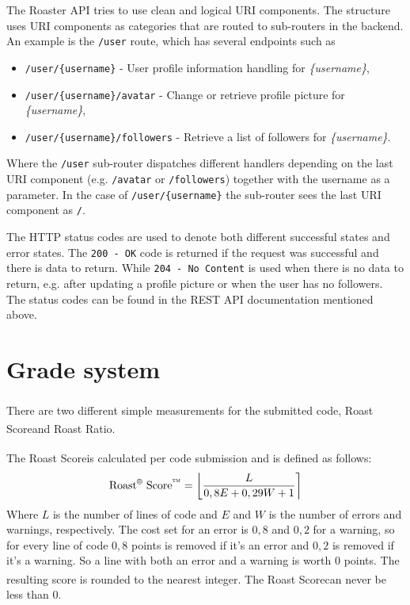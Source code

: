 \documentclass[12pt,a4paper]{report}
\begin{document}
The Roaster API tries to use clean and logical URI components. The structure uses URI components as categories that are routed to sub-routers in the backend. An example is the \texttt{/user} route, which has several endpoints such as
\begin{itemize}
    \item \texttt{/user/\{username\}} - User profile information handling for \textit{\{username\}},
    \item \texttt{/user/\{username\}/avatar} - Change or retrieve profile picture for \textit{\{username\}},
    \item \texttt{/user/\{username\}/followers} - Retrieve a list of followers for \textit{\{username\}}.
\end{itemize}
Where the \texttt{/user} sub-router dispatches different handlers depending on the last URI component (e.g. \texttt{/avatar} or \texttt{/followers}) together with the username as a parameter. In the case of \texttt{/user/\{username\}} the sub-router sees the last URI component as \texttt{/}.

The HTTP status codes are used to denote both different successful states and error states. The \texttt{200 - OK} code is returned if the request was successful and there is data to return. While \texttt{204 - No Content} is used when there is no data to return, e.g. after updating a profile picture or when the user has no followers. The status codes can be found in the REST API documentation mentioned above.

\newcommand{\rratio}{Roast\textsuperscript{\textregistered} Ratio\textsuperscript{\texttrademark}}
\newcommand{\rscore}{Roast\textsuperscript{\textregistered} Score\textsuperscript{\texttrademark}}

\section{Grade system}
There are two different simple measurements for the submitted code, \rscore and \rratio.

The \rscore is calculated per code submission and is defined as follows:
\begin{equation*}
    \text{\rscore} = \left\lfloor\frac{L}{0,8E + 0,29W + 1}\right\rceil
\end{equation*}
Where $L$ is the number of lines of code and $E$ and $W$ is the number of errors and warnings, respectively. The cost set for an error is $0,8$ and $0,2$ for a warning, so for every line of code $0,8$ points is removed if it's an error and $0,2$ is removed if it's a warning. So a line with both an error and a warning is worth $0$ points. The resulting score is rounded to the nearest integer. The \rscore can never be less than $0$.
\end{document}
